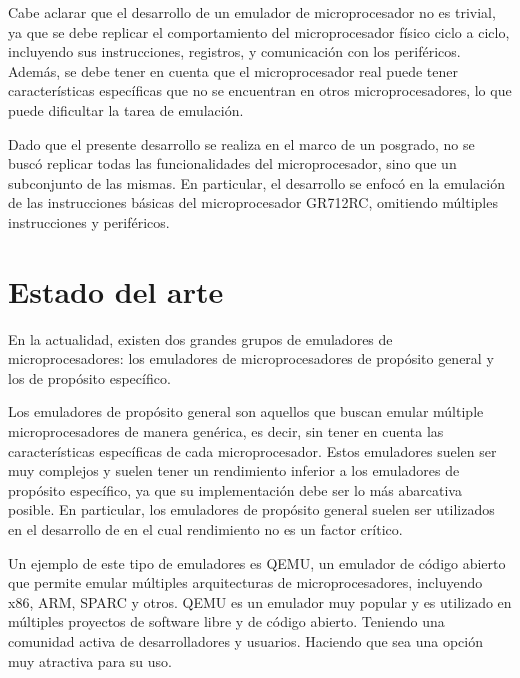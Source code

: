 
\vspace{1cm}

\newpage

Cabe aclarar que el desarrollo de un emulador de microprocesador no es trivial, ya que se debe replicar el comportamiento del microprocesador físico ciclo a ciclo, incluyendo sus instrucciones, registros, y comunicación con los periféricos. Además, se debe tener en cuenta que el microprocesador real puede tener características específicas que no se encuentran en otros microprocesadores, lo que puede dificultar la tarea de emulación.

Dado que el presente desarrollo se realiza en el marco de un posgrado, no se buscó replicar todas las funcionalidades del microprocesador, sino que un subconjunto de las mismas. En particular, el desarrollo se enfocó en la emulación de las instrucciones básicas del microprocesador GR712RC, omitiendo múltiples instrucciones y periféricos.

\section{Estado del arte}
\label{sec:estado_arte}

En la actualidad, existen dos grandes grupos de emuladores de microprocesadores: los emuladores de microprocesadores de propósito general y los de propósito específico.

Los emuladores de propósito general son aquellos que buscan emular múltiple microprocesadores de manera genérica, es decir, sin tener en cuenta las características específicas de cada microprocesador. Estos emuladores suelen ser muy complejos y suelen tener un rendimiento inferior a los emuladores de propósito específico, ya que su implementación debe ser lo más abarcativa posible. En particular, los emuladores de propósito general suelen ser utilizados en el desarrollo de en el cual rendimiento no es un factor crítico.

Un ejemplo de este tipo de emuladores es QEMU, un emulador de código abierto que permite emular múltiples arquitecturas de microprocesadores, incluyendo x86, ARM, SPARC y otros. QEMU es un emulador muy popular y es utilizado en múltiples proyectos de software libre y de código abierto. Teniendo una comunidad activa de desarrolladores y usuarios. Haciendo que sea una opción muy atractiva para su uso.

